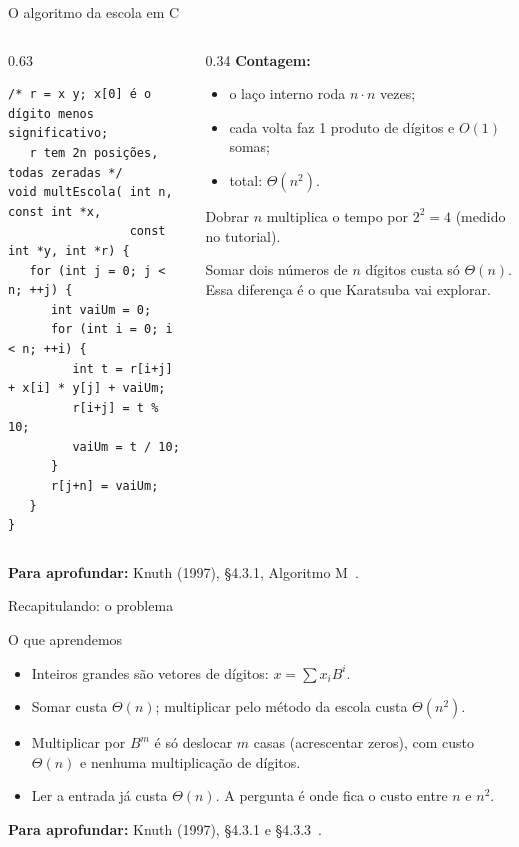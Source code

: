 \documentclass[aspectratio=169,xcolor=table]{beamer}
\newcommand{\fonte}[1]{%
  \vfill
  {\tiny\color{gray!55!black}\textbf{Para aprofundar:} #1\par}%
}
\begin{document}
\begin{frame}[fragile]{O algoritmo da escola em C}
  \begin{columns}[T]
    \begin{column}{0.63\textwidth}
\begin{lstlisting}
/* r = x y; x[0] é o dígito menos significativo;
   r tem 2n posições, todas zeradas */
void multEscola( int n, const int *x,
                 const int *y, int *r) {
   for (int j = 0; j < n; ++j) {
      int vaiUm = 0;
      for (int i = 0; i < n; ++i) {
         int t = r[i+j] + x[i] * y[j] + vaiUm;
         r[i+j] = t % 10;
         vaiUm = t / 10;
      }
      r[j+n] = vaiUm;
   }
}
\end{lstlisting}
    \end{column}
    \begin{column}{0.34\textwidth}
      \scriptsize
      \textbf{Contagem:}
      \begin{itemize}\scriptsize
        \item o laço interno roda $n\cdot n$ vezes;
        \item cada volta faz 1 produto de dígitos e $O(1)$ somas;
        \item total: $\Theta(n^2)$.
      \end{itemize}
      \smallskip
      Dobrar $n$ multiplica o tempo por $2^2=4$ (medido no tutorial).
      \smallskip

      Somar dois números de $n$ dígitos custa só $\Theta(n)$. Essa diferença é o que
      Karatsuba vai explorar.
    \end{column}
  \end{columns}
  \fonte{Knuth (1997), \S 4.3.1, Algoritmo M~\cite{knuth1997seminumerical}.}
\end{frame}

\begin{frame}{Recapitulando: o problema}
  \begin{block}{O que aprendemos}
    \begin{itemize}\scriptsize
      \item Inteiros grandes são vetores de dígitos: $x=\sum x_i B^i$.
      \item Somar custa $\Theta(n)$; multiplicar pelo método da escola custa $\Theta(n^2)$.
      \item Multiplicar por $B^m$ é só deslocar $m$ casas (acrescentar zeros), com custo
            $\Theta(n)$ e nenhuma multiplicação de dígitos.
      \item Ler a entrada já custa $\Theta(n)$. A pergunta é onde fica o custo entre $n$ e $n^2$.
    \end{itemize}
  \end{block}
  \fonte{Knuth (1997), \S 4.3.1 e \S 4.3.3~\cite{knuth1997seminumerical}.}
\end{frame}
\end{document}
